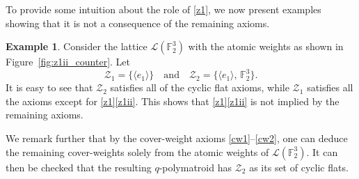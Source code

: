 \documentclass[a4paper,11pt,reqno]{article}
\theoremstyle{definition}
\newtheorem{example}[theorem]{{{Example}}}
\newcommand{\F}{\mathbb{F}}
\begin{document}
To provide some intuition about the role of \ref{z1}, we now present examples showing that it is not a consequence of the remaining axioms.
\begin{example}   
    Consider the lattice $\mathcal{L}(\mathbb{F}_2^3)$ with the atomic weights as shown in Figure~\ref{fig:z1ii_counter}. Let 
    \[
    \mathcal{Z}_1=\{\langle e_1 \rangle\} \quad \text{and} \quad \mathcal{Z}_2 = \{\langle e_1 \rangle,\,\F_2^3\}.
    \]
    It is easy to see that $\mathcal{Z}_2$ satisfies all of the cyclic flat axioms, while $\mathcal{Z}_1$ satisfies all the axioms except for \ref{z1}\ref{z1ii}. This shows that \ref{z1}\ref{z1ii} is not implied by the remaining axioms.

    We remark further that by the cover-weight axioms \ref{cw1}--\ref{cw2}, one can deduce the remaining cover-weights solely from the atomic weights of $\mathcal{L}(\mathbb{F}_2^3)$. It can then be checked that the resulting $q$-polymatroid has $\mathcal{Z}_2$ as its set of cyclic flats.
    

\end{example}
\end{document}
